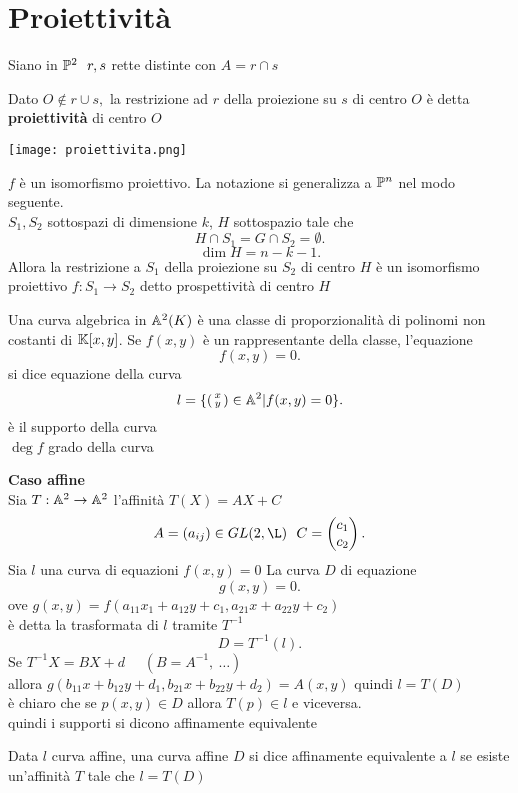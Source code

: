 \documentclass[12px]{article}
\begin{document}
 \section{Proiettività}
 Siano in $\mathbb{P}^2\ \ r,s$ rette distinte con $A = r\cap s$
  \begin{defi}
 	Dato $O\not\in r\cup s,$ la restrizione ad $r$ della proiezione su $s$ di centro $O$ è detta  \textbf{proiettività} di centro $O$
\end{defi}
\begin{center}
	\texttt{[image: proiettivita.png]}
\end{center}
$f$ è un isomorfismo proiettivo. La notazione si generalizza a $\mathbb{P}^n$ nel modo seguente.\\
$S_1,S_2$ sottospazi di dimensione $k$, $H$ sottospazio tale che \[
H\cap S_1 = G\cap S_2 = \emptyset
.\] 
\[
\dim H = n  - k - 1
.\] Allora la restrizione a $S_1$ della proiezione su $S_2$ di centro $H$ è un isomorfismo proiettivo $f: S_1 \rightarrow S_2 $ detto prospettività di centro $H$
\newpage
\begin{defi}
	Una curva algebrica in $\mathbb{A}^2(K)$ è una classe di proporzionalità di polinomi non costanti di  $\mathbb{K}[x,y]$. Se  $f(x,y)$ è un rappresentante della classe, l'equazione 
	\[
	f(x,y) = 0
	.\] si dice equazione della curva
	\[
		 l= \{\left(\begin{smallmatrix}x\\y\end{smallmatrix}\right)\in \mathbb{A}^2|f(x,y) = 0\}
	.\] è il supporto della curva\\
	$\deg f$ grado della curva
\end{defi}
\textbf{Caso affine}\\
Sia $T: \mathbb{A}^2 \rightarrow \mathbb{A}^2$ l'affinità $T(X) = AX + C$
 \[
	 A = (a_{ij})\in GL(2,\L) \ \ C = \matrice{c_1\\c_2}
.\] 
Sia $l$ una curva di equazioni $f(x,y) = 0$
La curva $D$ di equazione 
\[
g(x,y) =0 
.\] 
ove $g(x,y) = f(a_{11}x_1+a_{12}y+c_1,a_{21}x+a_{22}y+c_2)$ \\
è detta la trasformata di $l$ tramite $T^{-1}$
 \[
 D = T^{-1}(l)
.\] 
Se $T^{-1}X = BX + d$ \ \ $(B = A^{-1}, \ \ldots)$\\
allora  $g(b_{11}x + b_{12}y + d_1, b_{21}x+b_{22}y + d_2) = A(x,y)$
quindi $l = T(D)$\\
è chiaro che se  $p(x,y)\in D$ allora $T(p)\in l$ e viceversa.\\
quindi i supporti si dicono affinamente equivalente
\begin{defi}
	Data $l$ curva affine, una curva affine $D$  si dice affinamente equivalente a $l$ se esiste un'affinità $T$ tale che $l = T(D)$
\end{defi}
\end{document}
